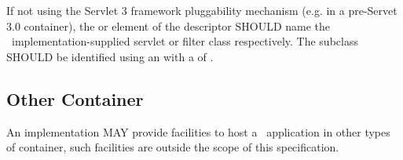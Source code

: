 If not using the Servlet 3 framework pluggability mechanism (e.g. in a pre-Servet 3.0 container), the  or  element of the  descriptor SHOULD name the \jaxrs\ implementation-supplied servlet or filter class respectively. The  subclass SHOULD be identified using an  with a  of .


\subsection{Other Container}

An implementation MAY provide facilities to host a \jaxrs\ application in other types of container, such facilities are outside the scope of this specification.